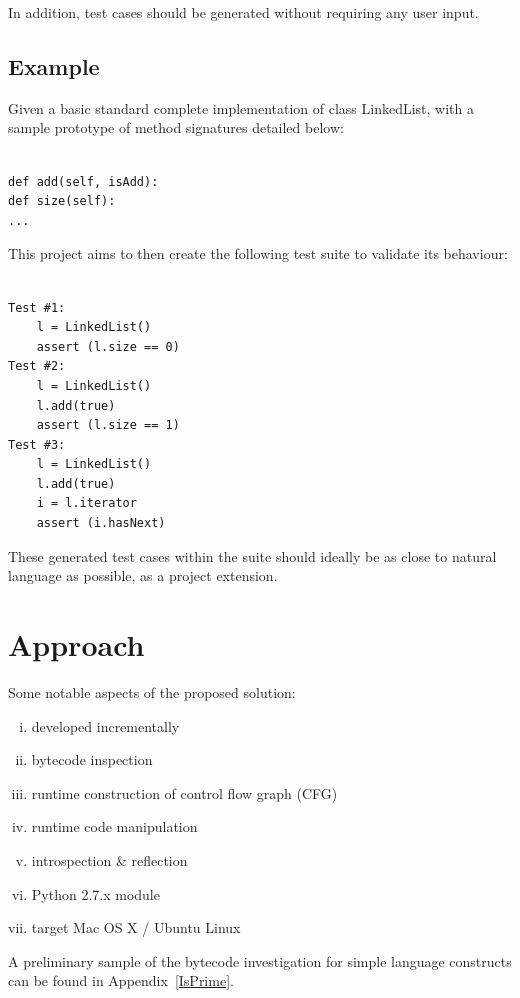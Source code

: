 \documentclass{icldt}
\numberwithin{equation}{section}       %
\begin{document}
In addition, test cases should be generated without requiring any user input.

\subsection*{Example}
Given a basic standard complete implementation of class \textsf{LinkedList}, with a sample prototype of method signatures detailed below:

\lstset{language=Python}          %
\begin{lstlisting}[frame=single]  % Start your code-block

def add(self, isAdd):
def size(self):
...
\end{lstlisting}

This project aims to then create the following test suite to validate its behaviour:

\begin{lstlisting}[frame=single]  % Start your code-block

Test #1:
	l = LinkedList()
	assert (l.size == 0)
Test #2:
	l = LinkedList()
	l.add(true)
	assert (l.size == 1)
Test #3:
	l = LinkedList()
	l.add(true)
	i = l.iterator
	assert (i.hasNext)
\end{lstlisting}

These generated test cases within the suite should ideally be as close to natural language as possible, as a project extension.
\section{Approach}
Some notable aspects of the proposed solution:
\begin{enumerate}[i.]
	\item developed incrementally
	\item bytecode inspection
	\item runtime construction of control flow graph (CFG)
	\item runtime code manipulation
	\item introspection \& reflection
	\item Python 2.7.x module
	\item target Mac OS X / Ubuntu Linux
\end{enumerate}

A preliminary sample of the bytecode investigation for simple language constructs can be found in Appendix~\ref{IsPrime}.
\end{document}
